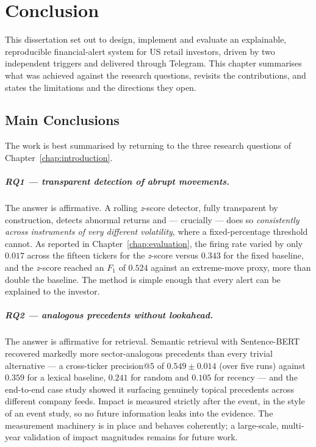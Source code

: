 
\chapter{Conclusion}
\label{chap:conclusion}

This dissertation set out to design, implement and evaluate an explainable, reproducible
financial-alert system for US retail investors, driven by two independent triggers and delivered
through Telegram. This chapter summarises what was achieved against the research questions, revisits
the contributions, and states the limitations and the directions they open.

\section{Main Conclusions}
\label{sec:concl_main}

The work is best summarised by returning to the three research questions of
Chapter~\ref{chap:introduction}.

\paragraph{RQ1 --- transparent detection of abrupt movements.}
The answer is affirmative. A rolling \emph{z}-score detector, fully transparent by construction,
detects abnormal returns and --- crucially --- does so \emph{consistently across instruments of very
different volatility}, where a fixed-percentage threshold cannot. As reported in
Chapter~\ref{chap:evaluation}, the firing rate varied by only $0.017$ across the fifteen tickers for
the \emph{z}-score versus $0.343$ for the fixed baseline, and the \emph{z}-score reached an $F_1$ of
$0.524$ against an extreme-move proxy, more than double the baseline. The method is simple enough that
every alert can be explained to the investor.

\paragraph{RQ2 --- analogous precedents without lookahead.}
The answer is affirmative for retrieval. Semantic retrieval with Sentence-BERT recovered markedly
more sector-analogous precedents than every trivial alternative --- a cross-ticker precision@$5$ of
$0.549 \pm 0.014$ (over five runs) against $0.359$ for a lexical baseline, $0.241$ for random and
$0.105$ for recency --- and the end-to-end case study showed it surfacing genuinely topical
precedents across different company feeds.
Impact is measured strictly after the event, in the style of an event study, so no future information
leaks into the evidence. The measurement machinery is in place and behaves coherently; a large-scale,
multi-year validation of impact magnitudes remains for future work.

